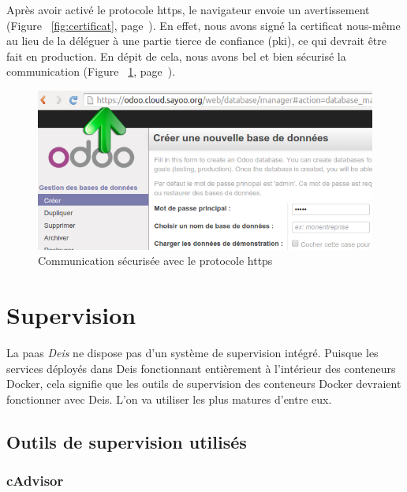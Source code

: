 \begin{onehalfspace}
Après avoir activé le protocole \acrshort{https}, le navigateur envoie un avertissement (Figure ~\ref{fig:certificat}, page~\pageref{fig:certificat}). En effet, nous avons signé la certificat nous-même au lieu de la déléguer à une partie tierce de confiance (\acrshort{pki}), ce qui devrait être fait en production. En dépit de cela, nous avons bel et bien sécurisé la communication (Figure ~\ref{fig:https}, page~\pageref{fig:https}).

\begin{figure}[H]
\centering
\includegraphics [scale=0.5]{chapitre5/assets/https}
\caption{Communication sécurisée avec le protocole \acrshort{https}}
\label{fig:https}
\end{figure}


\section{Supervision}

La \acrshort{paas} \emph{Deis} ne dispose pas d'un système de supervision intégré. Puisque les services déployés dans Deis fonctionnant entièrement à l'intérieur des conteneurs Docker, cela signifie que les outils de supervision des conteneurs Docker devraient fonctionner avec Deis. L'on va utiliser les plus matures d'entre eux.


\subsection{Outils de supervision utilisés}

	
\subsubsection*{cAdvisor}



\end{onehalfspace}
